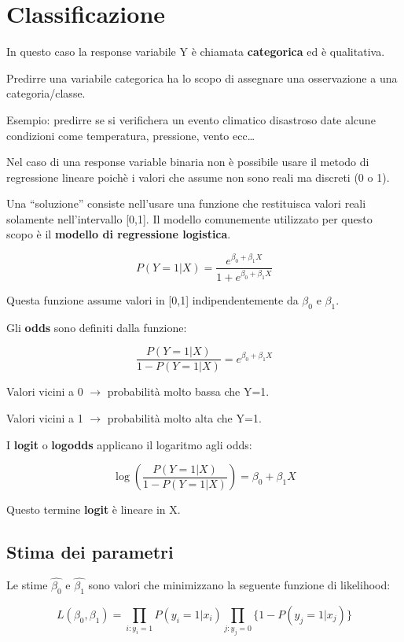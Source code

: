 \section{Classificazione}

In questo caso la response variabile Y è chiamata \textbf{categorica} ed è
qualitativa.

Predirre una variabile categorica ha lo scopo di assegnare una osservazione
a una categoria/classe.

Esempio: predirre se si verifichera un evento climatico disastroso date alcune
condizioni come temperatura, pressione, vento ecc\dots

Nel caso di una response variable binaria non è possibile usare il metodo di
regressione lineare poichè i valori che assume non sono reali ma discreti (0 o
1).

Una ``soluzione'' consiste nell'usare una funzione che restituisca valori reali
solamente nell'intervallo [0,1]. Il modello comunemente utilizzato per questo
scopo è il \textbf{modello di regressione logistica}.

\begin{equation}
P(Y=1|X) = \frac{e^{\beta_0+\beta_1 X}}{1 + e^{\beta_0+\beta_1 X}}
\end{equation}

Questa funzione assume valori in [0,1] indipendentemente da $\beta_0$ e
$\beta_1$.

Gli \textbf{odds} sono definiti dalla funzione:

\begin{equation}
\frac{P(Y=1|X)}{1-P(Y=1|X)} = e^{\beta_0+\beta_1 X}
\end{equation}

Valori vicini a 0 $\rightarrow$ probabilità molto bassa che Y=1.

Valori vicini a 1 $\rightarrow$ probabilità molto alta che Y=1.

I \textbf{logit} o \textbf{logodds} applicano il logaritmo agli odds:

\begin{equation}
\log \left( \frac{P(Y=1|X)}{1-P(Y=1|X)} \right) = \beta_0+\beta_1 X
\end{equation}

Questo termine \textbf{logit} è lineare in X.

\subsection{Stima dei parametri}

Le stime $\hat{\beta_0}$ e $\hat{\beta_1}$ sono valori che minimizzano
la seguente funzione di likelihood:

\begin{equation}
L(\beta_0, \beta_1) = \prod_{i:y_i = 1} P(y_i=1|x_i) \prod_{j:y_j = 0} \{1 - P(y_j=1|x_j)\}
\end{equation}








